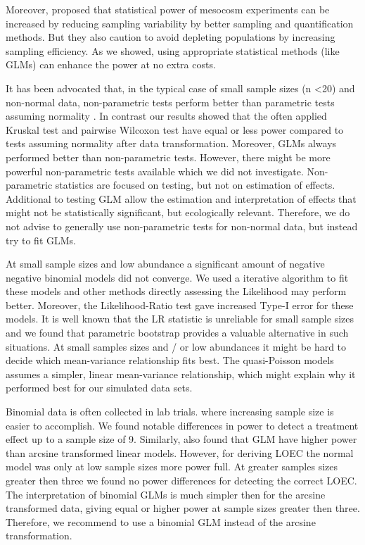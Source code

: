 \documentclass{scrartcl}
\begin{document}
Moreover, \citet{brock_minimum_2014} proposed that statistical power of mesocosm experiments can be increased by reducing sampling variability by better sampling and quantification methods. 
But they also caution to avoid depleting populations by increasing sampling efficiency.
As we showed, using appropriate statistical methods (like GLMs) can enhance the power at no extra costs.


It has been advocated that, in the typical case of small sample sizes (n \textless 20) and non-normal data, non-parametric tests perform better than parametric tests assuming normality \citep{wang_making_2011}.
In contrast our results showed that the often applied Kruskal test and pairwise Wilcoxon test have equal or less power compared to tests assuming normality after data transformation.
Moreover, GLMs always performed better than non-parametric tests. 
However, there might be more powerful non-parametric tests available \citep{konietschke_rank-based_2012} which we did not investigate.
Non-parametric statistics are focused on testing, but not on estimation of effects.
Additional to testing GLM allow the estimation and interpretation of effects that might not be statistically significant, but ecologically relevant.
Therefore, we do not advise to generally use non-parametric tests for non-normal data, but instead try to fit GLMs.

At small sample sizes and low abundance a significant amount of negative negative binomial models did not converge.
We used a iterative algorithm to fit these models \citep{venables_modern_2002} and other methods directly assessing the Likelihood may perform better.
Moreover, the Likelihood-Ratio test gave increased Type-I error for these models.
It is well known that the LR statistic is unreliable for small sample sizes \citep{bolker_generalized_2009,wilks_large-sample_1938} and we found that parametric bootstrap provides a valuable alternative in such situations.
At small samples sizes and / or low abundances it might be hard to decide which mean-variance relationship fits best.
The quasi-Poisson models assumes a simpler, linear mean-variance relationship, which might explain why it performed best for our simulated data sets. 


Binomial data is often collected in lab trials. where increasing sample size is easier to accomplish. 
We found notable differences in power to detect a treatment effect up to a sample size of 9.
Similarly, \citet{warton_arcsine_2011} also found that GLM have higher power than arcsine transformed linear models.
However, for deriving LOEC the normal model was only at low sample sizes more power full. At greater samples sizes greater then three we found no power differences for detecting the correct LOEC.
The interpretation of binomial GLMs is much simpler then for the arcsine transformed data, giving equal or higher power at sample sizes greater then three. 
Therefore, we recommend to use a binomial GLM instead of the arcsine transformation.
\end{document}
